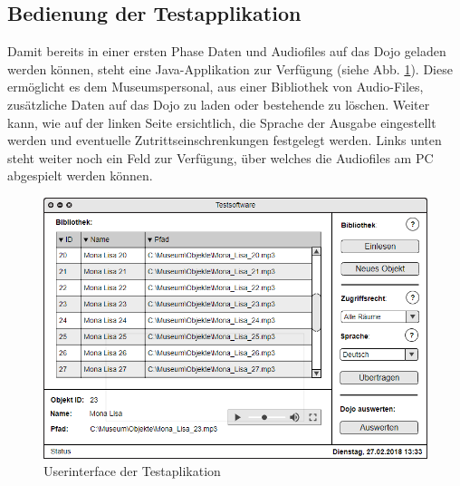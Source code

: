 \documentclass[10pt,a4paper,oneside]{99_fhnwreport}
\begin{document}
\newpage

\subsection{Bedienung der Testapplikation}
Damit bereits in einer ersten Phase Daten und Audiofiles auf das Dojo geladen werden können, steht eine Java-Applikation zur Verfügung (siehe Abb. \ref{fig:testaplikation}). Diese ermöglicht es dem Museumspersonal, aus einer Bibliothek von Audio-Files, zusätzliche Daten auf das Dojo zu laden oder bestehende zu löschen. Weiter kann, wie auf der linken Seite ersichtlich, die Sprache der Ausgabe eingestellt werden und eventuelle Zutrittseinschrenkungen festgelegt werden. Links unten steht weiter noch ein Feld zur Verfügung, über welches die Audiofiles am PC abgespielt werden können.

\begin{figure}[htb]
\includegraphics[width=\textwidth]{Testsoftware.png}
\caption{Userinterface der Testaplikation} %
\label{fig:testaplikation}
\end{figure}


\end{document}
